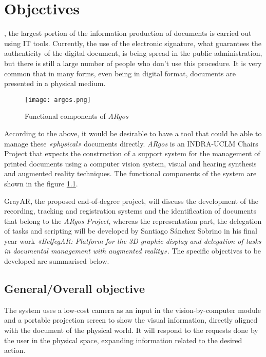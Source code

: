 \chapter{Objectives}
\label{chap:objetivos_eng}

, the largest portion of the information production of documents is carried out using IT tools. Currently, the use of the electronic signature, what guarantees the authenticity of the digital document, is being spread in the public administration, but there is still a large number of people who don't use this procedure. It is very common that in many forms, even being in digital format, documents are presented in a physical medium.

\begin{figure}[h!]
  \begin{center}
      \texttt{[image: argos.png]}
      \caption{Functional components of \textit{ARgos}}
      \label{fig:diagrama_argos_eng}
    \end{center}
\end{figure}

According to the above, it would be desirable to have a tool that could be able to manage these \textit{«physical»} documents directly. \textit{ARgos} is an INDRA-UCLM Chairs Project that expects the construction of a support system for the management of printed documents using a computer vision system, visual and hearing synthesis and augmented reality techniques. The functional components of the system are shown in the figure \ref{fig:diagrama_argos_eng}.

GrayAR, the proposed end-of-degree project, will discuss the development of the recording, tracking and registration systems and the identification of documents that belong to the \textit{ARgos Project}, whereas the representation part, the delegation of tasks and scripting will be developed by Santiago Sánchez Sobrino in his final year work \textit{«BelfegAR: Platform for the 3D graphic display and delegation of tasks in documental management with augmented reality»}. The specific objectives to be developed are summarised below.


\section{General/Overall objective}
The system uses a low-cost camera as an input in the vision-by-computer module and a portable projection screen to show the visual information, directly aligned with the document of the physical world. It will respond to the requests done by the user in the physical space, expanding information related to the desired action.

